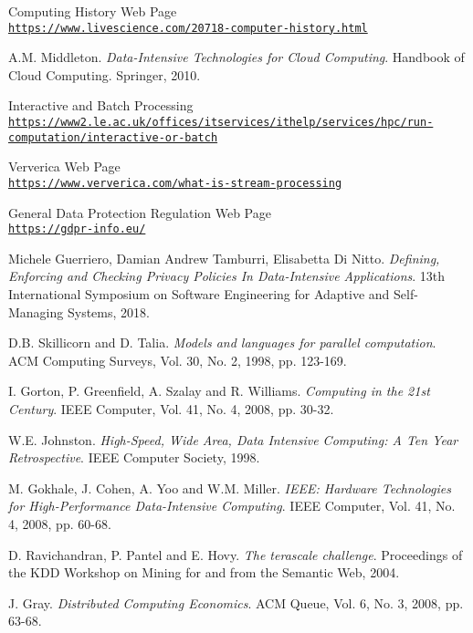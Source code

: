 \begin{thebibliography}{9}

Computing History Web Page
\\\texttt{\url{https://www.livescience.com/20718-computer-history.html}}

A.M. Middleton.
\textit{Data-Intensive Technologies for Cloud Computing}. 
Handbook of Cloud Computing. Springer, 2010.

Interactive and Batch Processing
\\\texttt{\url{https://www2.le.ac.uk/offices/itservices/ithelp/services/hpc/run-computation/interactive-or-batch}}

Ververica Web Page
\\\texttt{\url{https://www.ververica.com/what-is-stream-processing}}

General Data Protection Regulation Web Page
\\\texttt{\url{https://gdpr-info.eu/}}

Michele Guerriero, Damian Andrew Tamburri, Elisabetta Di Nitto.
\textit{Defining, Enforcing and Checking Privacy Policies In Data-Intensive Applications}. 
13th International Symposium on Software Engineering for Adaptive and Self-Managing Systems, 2018.

D.B. Skillicorn and D. Talia.
\textit{Models and languages for parallel computation}. 
ACM Computing Surveys, Vol. 30, No. 2, 1998, pp. 123-169.

I. Gorton, P. Greenfield, A. Szalay and R. Williams.
\textit{Computing in the 21st Century}. 
IEEE Computer, Vol. 41, No. 4, 2008, pp. 30-32.

W.E. Johnston.
\textit{High-Speed, Wide Area, Data Intensive Computing: A Ten Year Retrospective}. 
IEEE Computer Society, 1998.

M. Gokhale, J. Cohen, A. Yoo and W.M. Miller.
\textit{IEEE: Hardware Technologies for High-Performance Data-Intensive Computing}. 
IEEE Computer, Vol. 41, No. 4, 2008, pp. 60-68.

D. Ravichandran, P. Pantel and E. Hovy.
\textit{The terascale challenge}. 
Proceedings of the KDD Workshop on Mining for and from the Semantic Web, 2004.

J. Gray.
\textit{Distributed Computing Economics}. 
ACM Queue, Vol. 6, No. 3, 2008, pp. 63-68.


\end{thebibliography}
